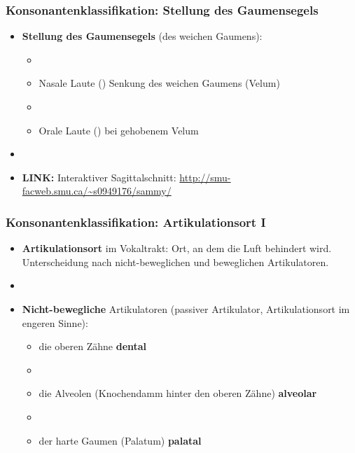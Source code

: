 \begin{frame}
\frametitle{Konsonantenklassifikation: Stellung des Gaumensegels}

	\begin{itemize}
		\item \textbf{Stellung des Gaumensegels} (des weichen Gaumens):
		
		\begin{itemize}
			\item[]
			\item Nasale Laute (\zB \textipa{ [ m , n ]}) \ras Senkung des weichen Gaumens (Velum)
			\item[]
			\item Orale Laute (\zB \textipa{ [ f , a ]}) \ras bei gehobenem Velum
		\end{itemize}
		
		\item[]
		\item \textbf{LINK:} Interaktiver Sagittalschnitt: \url{http://smu-facweb.smu.ca/~s0949176/sammy/}
	\end{itemize}
	
\end{frame}



\begin{frame}
\frametitle{Konsonantenklassifikation: Artikulationsort I}

	\begin{itemize}
	\item \textbf{Artikulationsort} im Vokaltrakt: Ort, an dem die Luft behindert wird.
          Unterscheidung nach nicht-beweglichen und beweglichen Artikulatoren.

		\item[]
		\item \textbf{Nicht-bewegliche} Artikulatoren (passiver Artikulator, Artikulationsort im engeren Sinne):
			
		\begin{itemize}
			\item die oberen Zähne \ras \textbf{dental}
			\item[]
			\item die Alveolen (Knochendamm hinter den oberen Zähne) \ras \textbf{alveolar}
			\item[]
			\item der harte Gaumen (Palatum) \ras \textbf{palatal}
		\end{itemize}
		
	\end{itemize}
	
\end{frame}


